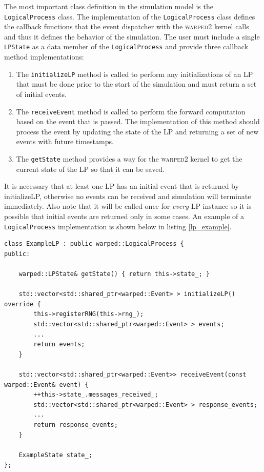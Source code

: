\documentclass[11pt]{book}
\begin{document}
The most important class definition in the simulation model is the \texttt{LogicalProcess} class.
The implementation of the \texttt{LogicalProcess} class defines the callback functions that the
event dispatcher with the \textsc{warped2} kernel calls and thus it defines the behavior of the simulation.
The user must include a single \texttt{LPState} as a data member of the \texttt{LogicalProcess}
and provide three callback method implementations:

\begin{enumerate}
    \item The \texttt{initializeLP} method is called to perform any initializations of an LP that
        must be done prior to the start of the simulation and must return a set of initial events.
    \item The \texttt{receiveEvent} method is called to perform the forward computation based on
        the event that is passed.  The implementation of this method should process the event by
        updating the state of the LP and returning a set of new events with future timestamps.
    \item The \texttt{getState} method provides a way for the \textsc{warped2} kernel to get the
        current state of the LP so that it can be saved.
\end{enumerate}

It is necessary that at least one LP has an initial event that is returned by initializeLP,
otherwise no events can be received and simulation will terminate immediately.  Also note that
it will be called once for \emph{every} LP instance so it is possible that initial events
are returned only in some cases.  An example of a \texttt{LogicalProcess} implementation is shown below
in listing \ref{lp_example}.

\begin{lstlisting}[caption=Example \textsc{warped2} LogicalProcess Definition, label=lp_example, float]
class ExampleLP : public warped::LogicalProcess {
public:

    warped::LPState& getState() { return this->state_; }

    std::vector<std::shared_ptr<warped::Event> > initializeLP() override {
        this->registerRNG(this->rng_);
        std::vector<std::shared_ptr<warped::Event> > events;
        ...
        return events;
    }

    std::vector<std::shared_ptr<warped::Event>> receiveEvent(const warped::Event& event) {
        ++this->state_.messages_received_;
        std::vector<std::shared_ptr<warped::Event> > response_events;
        ...
        return response_events;
    }

    ExampleState state_;
};
\end{lstlisting}
\end{document}
